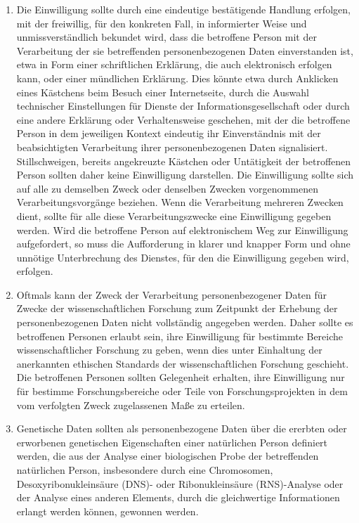 \begin{enumerate}

   \item Die Einwilligung sollte durch eine eindeutige bestätigende Handlung erfolgen, mit der freiwillig, für den
    konkreten Fall, in informierter Weise und unmissverständlich bekundet wird, dass die betroffene Person mit der
    Verarbeitung der sie betreffenden personenbezogenen Daten einverstanden ist, etwa in Form einer schriftlichen
    Erklärung, die auch elektronisch erfolgen kann, oder einer mündlichen Erklärung. Dies könnte etwa durch Anklicken
    eines Kästchens beim Besuch einer Internetseite, durch die Auswahl technischer Einstellungen für Dienste der
    Informationsgesellschaft oder durch eine andere Erklärung oder Verhaltensweise geschehen, mit der die betroffene
    Person in dem jeweiligen Kontext eindeutig ihr Einverständnis mit der beabsichtigten Verarbeitung ihrer
    personenbezogenen Daten signalisiert. Stillschweigen, bereits angekreuzte Kästchen oder Untätigkeit der betroffenen
    Person sollten daher keine Einwilligung darstellen. Die Einwilligung sollte sich auf alle zu demselben Zweck oder
    denselben Zwecken vorgenommenen Verarbeitungsvorgänge beziehen. Wenn die Verarbeitung mehreren Zwecken dient,
    sollte für alle diese Verarbeitungszwecke eine Einwilligung gegeben werden. Wird die betroffene Person auf
    elektronischem Weg zur Einwilligung aufgefordert, so muss die Aufforderung in klarer und knapper Form und ohne
    unnötige Unterbrechung des Dienstes, für den die Einwilligung gegeben wird, erfolgen.%
   \label{itm:eg-32}
   

   \item Oftmals kann der Zweck der Verarbeitung personenbezogener Daten für Zwecke der wissenschaftlichen Forschung zum
    Zeitpunkt der Erhebung der personenbezogenen Daten nicht vollständig angegeben werden. Daher sollte es betroffenen
    Personen erlaubt sein, ihre Einwilligung für bestimmte Bereiche wissenschaftlicher Forschung zu geben, wenn dies
    unter Einhaltung der anerkannten ethischen Standards der wissenschaftlichen Forschung geschieht. Die betroffenen
    Personen sollten Gelegenheit erhalten, ihre Einwilligung nur für bestimme Forschungsbereiche oder Teile von
    Forschungsprojekten in dem vom verfolgten Zweck zugelassenen Maße zu erteilen.%
   \label{itm:eg-33}
   

   \item Genetische Daten sollten als personenbezogene Daten über die ererbten oder erworbenen genetischen Eigenschaften
    einer natürlichen Person definiert werden, die aus der Analyse einer biologischen Probe der betreffenden
    natürlichen Person, insbesondere durch eine Chromosomen, Desoxyribonukleinsäure (DNS)- oder Ribonukleinsäure
    (RNS)-Analyse oder der Analyse eines anderen Elements, durch die gleichwertige Informationen erlangt werden können,
    gewonnen werden.%
   \label{itm:eg-34}
   

\end{enumerate}
